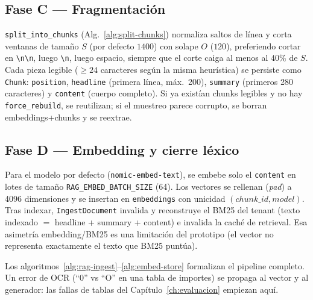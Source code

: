 \subsection*{Fase C --- Fragmentación}
\texttt{split\_into\_chunks} (Alg.~\ref{alg:split-chunks}) normaliza saltos de línea y corta ventanas de tamaño $S$ (por defecto $1400$) con solape $O$ ($120$), preferiendo cortar en \texttt{\textbackslash n\textbackslash n}, luego \texttt{\textbackslash n}, luego espacio, siempre que el corte caiga al menos al $40\%$ de $S$. Cada pieza legible ($\ge 24$ caracteres según la misma heurística) se persiste como \texttt{Chunk}: \texttt{position}, \texttt{headline} (primera línea, máx.\ 200), \texttt{summary} (primeros 280 caracteres) y \texttt{content} (cuerpo completo). Si ya existían chunks legibles y no hay \texttt{force\_rebuild}, se reutilizan; si el muestreo parece corrupto, se borran embeddings+chunks y se reextrae.

\subsection*{Fase D --- Embedding y cierre léxico}
Para el modelo por defecto (\texttt{nomic-embed-text}), se embebe solo el \texttt{content} en lotes de tamaño \texttt{RAG\_EMBED\_BATCH\_SIZE} (64). Los vectores se rellenan (\emph{pad}) a 4096 dimensiones y se insertan en \texttt{embeddings} con unicidad $(chunk\_id, model)$. Tras indexar, \texttt{IngestDocument} invalida y reconstruye el BM25 del tenant (texto indexado $=$ headline + summary + content) e invalida la caché de retrieval. Esa asimetría embedding/BM25 es una limitación del prototipo (el vector no representa exactamente el texto que BM25 puntúa).

Los algoritmos~\ref{alg:rag-ingest}--\ref{alg:embed-store} formalizan el pipeline completo. Un error de OCR (``0'' vs ``O'' en una tabla de importes) se propaga al vector y al generador: las fallas de tablas del Capítulo~\ref{ch:evaluacion} empiezan aquí.

